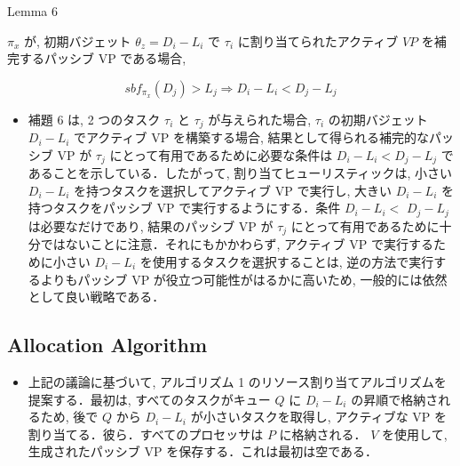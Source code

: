 \begin{frame}[label=lemma6]{Lemma 6}
    \begin{lemma}[]
        $\pi_{x}$ が, 初期バジェット $\theta_{z}=D_{i}-L_{i}$ で $\tau_{i}$ に割り当てられたアクティブ $V P$ を補完するパッシブ VP である場合,

        \begin{equation*}
            s b f_{\pi_{x}}\left(D_{j}\right)>L_{j} \Rightarrow D_{i}-L_{i}<D_{j}-L_{j}
        \end{equation*}
    \end{lemma}
\end{frame}

\begin{frame}{}
    \begin{itemize}
        \item 補題 6 は, 2 つのタスク $\tau_{i}$ と $\tau_{j}$ が与えられた場合, $\tau_{i}$ の初期バジェット $D_{i}-L_{i}$ でアクティブ VP を構築する場合, 結果として得られる補完的なパッシブ VP が $\tau_{j}$ にとって有用であるために必要な条件は $D_{i}-L_{i}<D_{j}-L_{j}$ であることを示している．したがって, 割り当てヒューリスティックは, 小さい $D_{i}-L_{i}$ を持つタスクを選択してアクティブ VP で実行し, 大きい $D_{i}-L_{i}$ を持つタスクをパッシブ VP で実行するようにする．条件 $D_{i}-L_{i}<$  $D_{j}-L_{j}$ は必要なだけであり, 結果のパッシブ VP が $\tau_{j}$ にとって有用であるために十分ではないことに注意．それにもかかわらず, アクティブ VP で実行するために小さい $D_{i}-L_{i}$ を使用するタスクを選択することは, 逆の方法で実行するよりもパッシブ VP が役立つ可能性がはるかに高いため, 一般的には依然として良い戦略である．
    \end{itemize}
\end{frame}


\subsection{Allocation Algorithm}
\label{ssec: allocation algorithm}

\begin{frame}{}
    \begin{itemize}
        \item 上記の議論に基づいて, アルゴリズム 1 のリソース割り当てアルゴリズムを提案する．最初は, すべてのタスクがキュー $Q$ に $D_{i}-L_{i}$ の昇順で格納されるため, 後で $Q$ から $D_{i}-L_{i}$ が小さいタスクを取得し, アクティブな VP を割り当てる．彼ら．すべてのプロセッサは $P$ に格納される． $V$ を使用して, 生成されたパッシブ VP を保存する．これは最初は空である．
    \end{itemize}
\end{frame}

